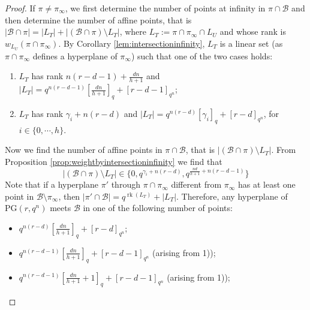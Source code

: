 \documentclass[11pt]{amsart}
\DeclareMathOperator{\rk}{rk}
\newcommand{\PG}{\mathrm{PG}}
\begin{document}
\begin{proof}
    If $\pi\not= \pi_\infty$, we first determine the number of points at infinity in $\pi\cap \mathcal{B}$ and then determine the number of affine points, that is $|\mathcal B \cap \pi| = |L_T|+\lvert (\mathcal{B} \cap \pi)\setminus L_T |$, where  $L_T:=\pi\cap \pi_\infty\cap L_U$ and whose rank is $w_{L_U}(\pi\cap\pi_{\infty})$. By Corollary \ref{lem:intersectioninfinity}, $L_T$ is a linear set (as $\pi\cap \pi_{\infty}$ defines a hyperplane of $\pi_{\infty}$) such that one of the two cases holds:
\begin{enumerate}
    \item[1)] $L_T$ has rank $n(r-d-1)+\frac{dn}{h+1}$ and $\lvert L_T \rvert=q^{n(r-d-1)}\left[\frac{dn}{h+1}\right]_q+[r-d-1]_{q^n}$;
    \item[2)] $L_T$ has rank $\gamma_i+n(r-d)$ and  
$|L_T|=q^{n(r-d)}[\gamma_i]_q+[r-d]_{q^n}$,
for $i\in \{0,\cdots, h\}$.
\end{enumerate}
Now we find the number of affine points in $\pi \cap \mathcal{B}$, that is $\lvert (\mathcal{B} \cap \pi)\setminus L_T |$.
    From Proposition \ref{prop:weightbyintersectioninfinity} we find that 
    $$\lvert (\mathcal{B} \cap \pi)\setminus L_T |\in \{0, q^{\gamma_i+n(r-d)},q^{\frac{nd}{h+1}+n(r-d-1)}\}$$
    Note that if a hyperplane $\pi'$ through $\pi\cap \pi_{\infty}$ different from $\pi_{\infty}$ has at least one point in $\mathcal{B}\setminus \pi_{\infty}$, then $|\pi'\cap \mathcal{B}|=q^{\rk(L_T)}+|L_T|$. Therefore, any hyperplane of $\PG(r,q^n)$ meets $\mathcal{B}$ in one of the following number of points:
\begin{itemize}
    \item[a)] $q^{n(r-d)}\left[\frac{dn}{h+1}\right]_q+[r-d]_{q^n}$;
    \item[b)] $ q^{n(r-d-1)}\left[\frac{dn}{h+1}\right]_q+[r-d-1]_{q^n}$ (arising from 1));
    \item[c)] $ q^{n(r-d-1)}\left[\frac{dn}{h+1}+1\right]_q+[r-d-1]_{q^n}$ (arising from 1));

\end{itemize}
\end{proof}
\end{document}
